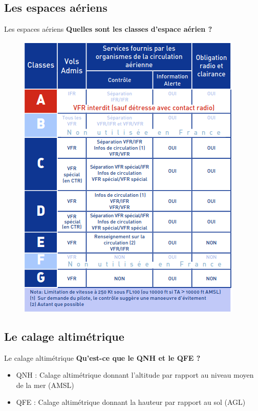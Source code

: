 \documentclass{beamer}
\begin{document}
\subsection{Les espaces aériens}
\begin{frame}{Les espaces aériens}
  \textbf{Quelles sont les classes d'espace aérien ?}

  \pause
  \begin{figure}
    \centering
    \includegraphics[scale=1.41]{images/espaces-aeriens.png}
  \end{figure}
\end{frame}

\subsection{Le calage altimétrique}
\begin{frame}{Le calage altimétrique}
  \textbf{Qu'est-ce que le QNH et le QFE ?}
  
  \begin{itemize}
    \item QNH : Calage altimétrique donnant l'altitude par rapport au niveau moyen de la mer (AMSL) \pause
    \item QFE : Calage altimétrique donnant la hauteur par rapport au sol (AGL)
  \end{itemize}

\end{frame}
\end{document}
